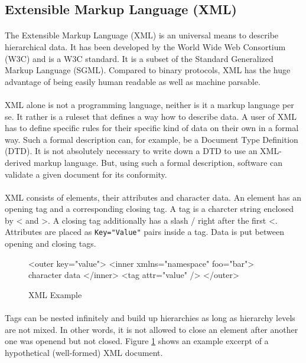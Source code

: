 \subsection{Extensible Markup Language (XML)}
\paragraph{}
The Extensible Markup Language (XML) is an universal means to describe hierarchical data. It has been developed by the World Wide Web Consortium (W3C) and is a W3C standard. It is a subset of the Standard Generalized Markup Language (SGML). Compared to binary protocols, XML has the huge advantage of being easily human readable as well as machine parsable.

\paragraph{}
XML alone is not a programming language, neither is it a markup language per se. It rather is a ruleset that defines a way how to describe data. A user of XML has to define specific rules for their specific kind of data on their own in a formal way. Such a formal description can, for example, be a Document Type Definition (DTD). It is not absolutely necessary to write down a DTD to use an XML-derived markup language. But, using such a formal description, software can validate a given document for its conformity.

\paragraph{}
XML consists of elements, their attributes and character data. An element has an opening tag and a corresponding closing tag. A tag is a charcter string enclosed by \glqq{}<\grqq{} and \glqq{}>\grqq{}. A closing tag additionally has a slash \glqq{}/\grqq{} right after the first \glqq{}<\grqq{}. Attributes are placed as \texttt{Key="Value"} pairs inside a tag. Data is put between opening and closing tags.

\begin{figure}[H]
\begin{listing}{1}
<outer key="value">
  <inner xmlns="namespace" foo="bar">
    character data
  </inner>
  <tag attr="value" />
</outer>
\end{listing}
\caption{XML Example}
\label{fig:XMLexample}
\end{figure}

\paragraph{}
Tags can be nested infinitely and build up hierarchies as long as hierarchy levels are not mixed. In other words, it is not allowed to close an element after another one was openend but not closed. Figure \ref{fig:XMLexample} shows an example excerpt of a hypothetical (well-formed) XML document.

